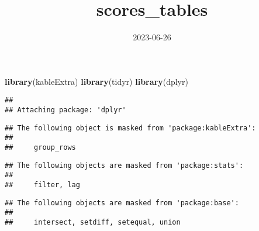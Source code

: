 \documentclass[
]{article}
\title{scores\_tables}
\author{}
\date{\vspace{-2.5em}2023-06-26}
\newenvironment{Shaded}{\begin{snugshade}}{\end{snugshade}}
\newcommand{\FunctionTok}[1]{\textcolor[rgb]{0.13,0.29,0.53}{\textbf{#1}}}
\newcommand{\NormalTok}[1]{#1}
\begin{document}
\maketitle

\begin{Shaded}
\begin{Highlighting}[]
\FunctionTok{library}\NormalTok{(kableExtra)}
\FunctionTok{library}\NormalTok{(tidyr)}
\FunctionTok{library}\NormalTok{(dplyr)}
\end{Highlighting}
\end{Shaded}

\begin{verbatim}
## 
## Attaching package: 'dplyr'
\end{verbatim}

\begin{verbatim}
## The following object is masked from 'package:kableExtra':
## 
##     group_rows
\end{verbatim}

\begin{verbatim}
## The following objects are masked from 'package:stats':
## 
##     filter, lag
\end{verbatim}

\begin{verbatim}
## The following objects are masked from 'package:base':
## 
##     intersect, setdiff, setequal, union
\end{verbatim}
\end{document}
